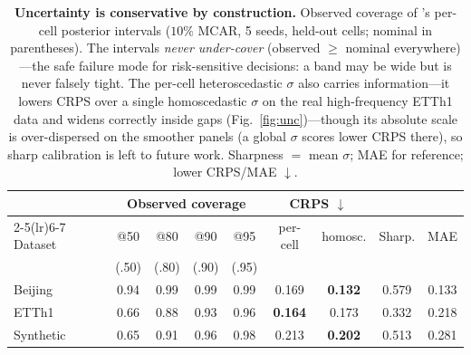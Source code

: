 \begin{table}[tbp]\centering\small
\setlength{\tabcolsep}{4pt}
\caption{\textbf{Uncertainty is conservative by construction.} Observed coverage of \cafe{}'s per-cell posterior intervals ($10\%$ MCAR, 5 seeds, held-out cells; nominal in parentheses). The intervals \emph{never under-cover} (observed $\ge$ nominal everywhere)---the safe failure mode for risk-sensitive decisions: a band may be wide but is never falsely tight. The per-cell heteroscedastic $\sigma$ also carries information---it lowers CRPS over a single homoscedastic $\sigma$ on the real high-frequency ETTh1 data and widens correctly inside gaps (Fig.~\ref{fig:unc})---though its absolute scale is over-dispersed on the smoother panels (a global $\sigma$ scores lower CRPS there), so sharp calibration is left to future work. Sharpness $=$ mean $\sigma$; MAE for reference; lower CRPS/MAE $\downarrow$.}
\label{tab:calib}
\begin{tabular}{@{}lcccccccc@{}}
\toprule
& \multicolumn{4}{c}{Observed coverage} & \multicolumn{2}{c}{CRPS $\downarrow$} & & \\
\cmidrule(lr){2-5}\cmidrule(lr){6-7}
Dataset & @50 & @80 & @90 & @95 & per-cell & homosc. & Sharp. & MAE \\
& \scriptsize(.50) & \scriptsize(.80) & \scriptsize(.90) & \scriptsize(.95) & & & & \\
\midrule
Beijing & 0.94 & 0.99 & 0.99 & 0.99 & 0.169 & \textbf{0.132} & 0.579 & 0.133 \\
ETTh1 & 0.66 & 0.88 & 0.93 & 0.96 & \textbf{0.164} & 0.173 & 0.332 & 0.218 \\
Synthetic & 0.65 & 0.91 & 0.96 & 0.98 & 0.213 & \textbf{0.202} & 0.513 & 0.281 \\
\bottomrule
\end{tabular}
\end{table}
